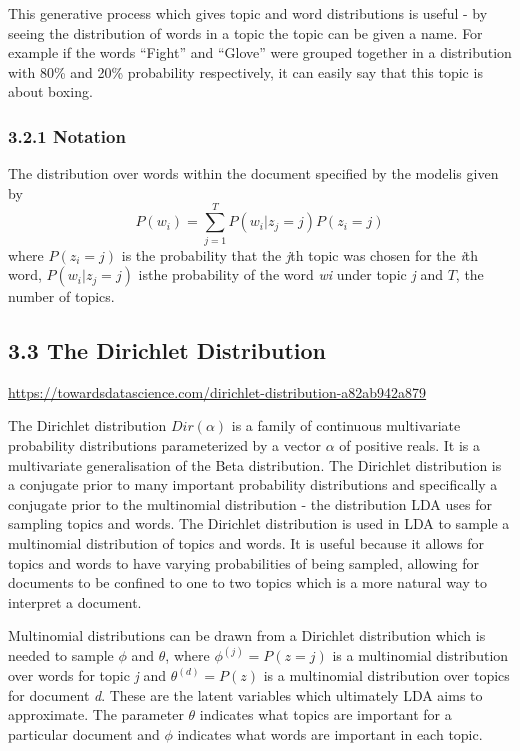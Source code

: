 \documentclass[
]{article}
\begin{document}
This generative process which gives topic and word distributions is
useful - by seeing the distribution of words in a topic the topic can be
given a name. For example if the words ``Fight'' and ``Glove'' were
grouped together in a distribution with 80\% and 20\% probability
respectively, it can easily say that this topic is about boxing.

\hypertarget{notation}{%
\subsubsection{3.2.1 Notation}\label{notation}}

The distribution over words within the document specified by the modelis
given by \begin{equation}
P(w_i) = \sum_{j=1}^{T}P(w_i|z_j =j)P(z_i=j)
\end{equation} where \(P(z_i=j)\) is the probability that the \emph{j}th
topic was chosen for the \emph{i}th word, \(P(w_i|z_j =j)\) isthe
probability of the word \emph{w}\emph{i} under topic \emph{j} and \(T\),
the number of topics.

\hypertarget{the-dirichlet-distribution}{%
\subsection{3.3 The Dirichlet
Distribution}\label{the-dirichlet-distribution}}

\url{https://towardsdatascience.com/dirichlet-distribution-a82ab942a879}

The Dirichlet distribution \(Dir(\alpha)\) is a family of continuous
multivariate probability distributions parameterized by a vector
\(\alpha\) of positive reals. It is a multivariate generalisation of the
Beta distribution. The Dirichlet distribution is a conjugate prior to
many important probability distributions and specifically a conjugate
prior to the multinomial distribution - the distribution LDA uses for
sampling topics and words. The Dirichlet distribution is used in LDA to
sample a multinomial distribution of topics and words. It is useful
because it allows for topics and words to have varying probabilities of
being sampled, allowing for documents to be confined to one to two
topics which is a more natural way to interpret a document.

Multinomial distributions can be drawn from a Dirichlet distribution
which is needed to sample \(\phi\) and \(\theta\), where
\({\phi}^{(j)} = P(z=j)\) is a multinomial distribution over words for
topic \emph{j} and \({\theta}^{(d)} = P(z)\) is a multinomial
distribution over topics for document \emph{d}. These are the latent
variables which ultimately LDA aims to approximate. The parameter
\(\theta\) indicates what topics are important for a particular document
and \(\phi\) indicates what words are important in each topic.
\end{document}
